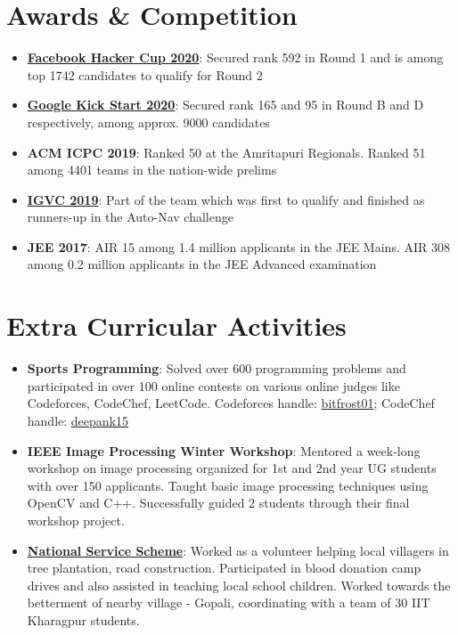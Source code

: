 \documentclass[letterpaper,11pt]{article}
\newcommand{\resumeItem}[2]{
  \item\small{
    \textbf{#1}{: #2 \vspace{-2pt}}
  }
}
\newcommand{\resumeSubItem}[2]{\resumeItem{#1}{#2}\vspace{-4pt}}
\newcommand{\resumeSubHeadingListStart}{\begin{itemize}[leftmargin=*]}
\newcommand{\resumeSubHeadingListEnd}{\end{itemize}}
\begin{document}
\section{Awards \& Competition}
  \resumeSubHeadingListStart
    \resumeSubItem{\href{https://www.facebook.com/codingcompetitions/hacker-cup/}{Facebook Hacker Cup 2020}}{Secured rank 592 in Round 1 and is among top 1742 candidates to qualify for Round 2}
    \resumeSubItem{\href{https://codingcompetitions.withgoogle.com/kickstart}{Google Kick Start 2020}}{Secured rank 165 and 95 in Round B and D respectively, among approx. 9000 candidates}
    \resumeSubItem{ACM ICPC 2019}{Ranked 50 at the Amritapuri Regionals. Ranked 51 among 4401 teams in the nation-wide prelims}
    \resumeSubItem{\href{http://www.igvc.org/}{IGVC 2019}}{Part of the team which was first to qualify and finished as runners-up in the Auto-Nav challenge}
    \resumeSubItem{JEE 2017}{AIR 15 among 1.4 million applicants in the JEE Mains. AIR 308 among 0.2 million applicants in the JEE Advanced examination}
    
  \resumeSubHeadingListEnd
  
 
\section{Extra Curricular Activities}
  \resumeSubHeadingListStart
    \resumeSubItem{Sports Programming}{Solved over 600 programming problems and participated in over 100 online contests on various online judges like Codeforces, CodeChef, LeetCode. Codeforces handle: \href{http://codeforces.com/profile/bitfrost01}{bitfrost01}; CodeChef handle: \href{https://www.codechef.com/users/deepank15}{deepank15}}
    \resumeSubItem{IEEE Image Processing Winter Workshop}{Mentored a week-long workshop on image processing organized for 1st and 2nd year UG students with over 150 applicants. Taught basic image processing techniques using OpenCV and C++. Successfully guided 2 students through their final workshop project.}
    \resumeSubItem{\href{https://nss.gov.in/}{National Service Scheme}}{Worked as a volunteer helping local villagers in tree plantation, road construction. Participated in blood donation camp drives and also assisted in teaching local school children. Worked towards the betterment of nearby village - Gopali, coordinating with a team of 30 IIT Kharagpur students.}
  \resumeSubHeadingListEnd
\end{document}
